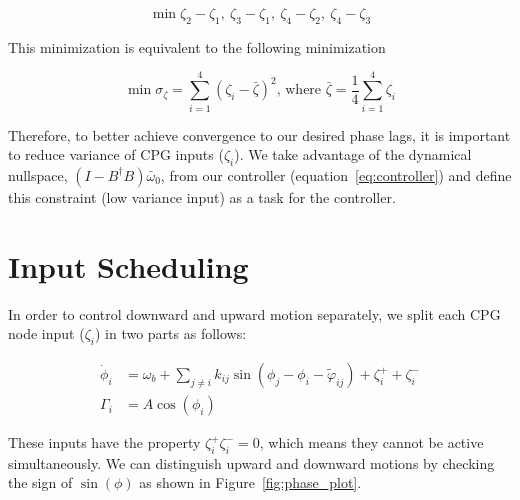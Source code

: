 \documentclass{article}
\begin{document}
\begin{equation}
	\min \zeta_2-\zeta_1, \ \zeta_3-\zeta_1, \ \zeta_4-\zeta_2, \ \zeta_4-\zeta_3 
    \label{eq:one_node1}
\end{equation}

This minimization is equivalent to the following minimization

\begin{equation}	
	\min \sigma_{\zeta} = \sum\limits_{i=1}^4 \left( \zeta_i - \bar{\zeta} \right)^2 \textrm{, where } \bar{\zeta} = \frac{1}{4}\sum\limits_{i=1}^4\zeta_i
	\label{eq:one_node2}
\end{equation}

Therefore, to better achieve convergence to our desired phase lags, it is important to reduce variance of CPG inputs ($\zeta_i$). We take advantage of the dynamical nullspace, $(I - B^\dagger B) \bar{\omega}_0$, from our controller (equation~\ref{eq:controller}) and define this constraint (low variance input) as a task for the controller.

\section*{Input Scheduling}

In order to control downward and upward motion separately, we split each CPG node input ($\zeta_i$) in two parts as follows:

\begin{align}\label{eq:one_node3}
	\dot \phi_i &= \omega_{b} + \sum_{j \neq i} k_{ij} \sin \left( \phi_j - \phi_i - \tilde{\varphi}_{ij} \right ) + \zeta_i^+ + \zeta_i^-\\
	\Gamma_i    &= A \cos(\phi_i)
\end{align}

These inputs have the property $\zeta_i^+  \zeta_i^- = 0$, which means they cannot be active simultaneously. We can distinguish upward and downward motions by checking the sign of $\sin(\phi)$ as shown in Figure~\ref{fig:phase_plot}.
\end{document}
